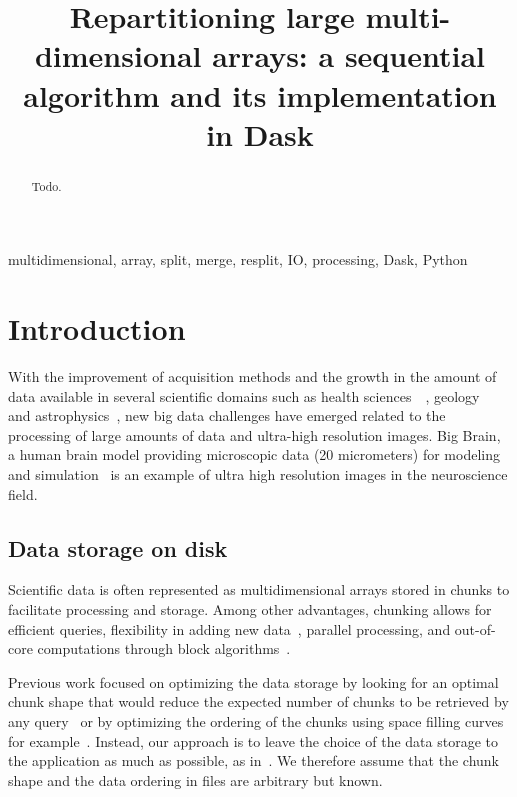 \documentclass[conference]{IEEEtran}
\begin{document}
\title{Repartitioning large multi-dimensional arrays: a sequential algorithm and its implementation in Dask}

\author{
}

\maketitle

\begin{abstract}
Todo.
\end{abstract}

\begin{IEEEkeywords}
multidimensional, array, split, merge, resplit, IO, processing, Dask, Python
\end{IEEEkeywords}

\section{Introduction}
With the improvement of acquisition methods and the growth in the amount of data
available in several scientific domains such as health
sciences~\cite{bigdata_health}~\cite{Amunts1472}, geology~\cite{big_data_geology}
and astrophysics~\cite{biguniverse}, new big data challenges have emerged related
to the processing of large amounts of data and ultra-high resolution
images. Big Brain, a human brain model providing microscopic data (20 micrometers) for
modeling and simulation~\cite{Amunts1472} is an example of ultra high resolution
images in the neuroscience field.

\subsection{Data storage on disk}
Scientific data is often represented as multidimensional arrays stored in
chunks to facilitate processing and storage. Among other advantages, chunking
allows for efficient queries, flexibility in adding new
data~\cite{optimal_chuking}, parallel processing, and out-of-core
computations through block algorithms~\cite{matthew_rocklin-proc-scipy-2015}.

Previous work focused on optimizing the data storage by looking for an optimal
chunk shape that would reduce the expected number of chunks to be retrieved by
any query~\cite{optimal_chuking} or by optimizing the ordering of the chunks
using space filling curves for example~\cite{optimal_chuking, openconnectomecluster}.
Instead, our approach is to leave the choice of the
data storage to the application as much as possible, as in~\cite{seqalgorithms}.
We therefore assume that the chunk shape and the data ordering in files are
arbitrary but known.
\end{document}
